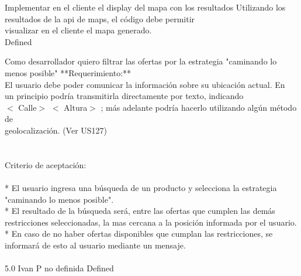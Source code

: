 		{Implementar en el cliente el display del mapa con los resultados} %
		{Utilizando los resultados de la api de maps, el código debe permitir\\
visualizar en el cliente el mapa generado.\\
} %
		{} %
		{} %
		{} %
		{Defined} %


\vspace{20pt}

	{Como desarrollador quiero filtrar las ofertas por la estrategia "caminando lo menos posible"} %
	{**Requerimiento:**\\
El usuario debe poder comunicar la información sobre su ubicación actual. En\\
un principio podría transmitirla directamente por texto, indicando\\
$<$ Calle$>$ $<$ Altura$>$ ; más adelante podría hacerlo utilizando algún método de\\
geolocalización. (Ver US127)\\
  \\
  \\
Criterio de aceptación:\\
  \\
* El usuario ingresa una búsqueda de un producto y selecciona la estrategia "caminando lo menos posible".  \\
* El resultado de la búsqueda será, entre las ofertas que cumplen las demás restricciones seleccionadas, la mas cercana a la posición informada por el usuario.\\
* En caso de no haber ofertas disponibles que cumplan las restricciones, se informará de esto al usuario mediante un mensaje. \\
  \\
} %
	{} %
	{5.0} %
	{Ivan P} %
	{no definida} %
	{Defined} %


\vspace{20pt}


